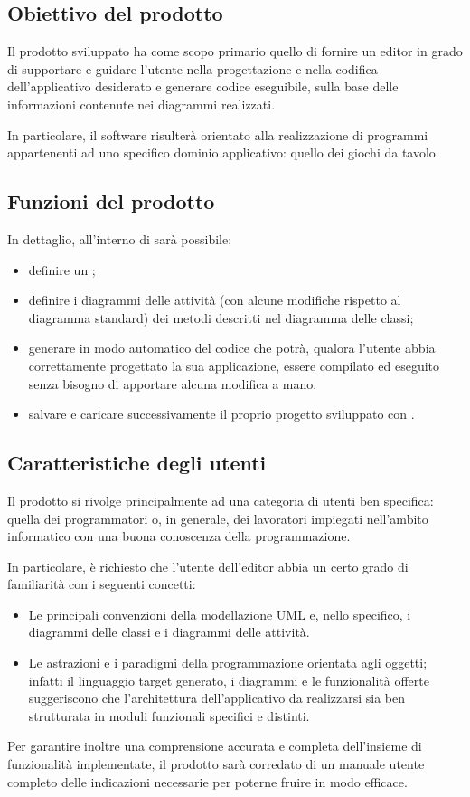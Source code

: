 \subsection{Obiettivo del prodotto}
Il prodotto sviluppato ha come scopo primario quello di fornire un editor in grado di supportare e guidare l'utente nella progettazione e nella codifica dell'applicativo desiderato e generare codice eseguibile, sulla base delle informazioni contenute nei diagrammi realizzati.

In particolare, il software risulterà orientato alla realizzazione di programmi appartenenti ad uno specifico dominio applicativo: quello dei giochi da tavolo.

\subsection{Funzioni del prodotto}
In dettaglio, all'interno di \proj{} sarà possibile:
\begin{itemize}
	\item definire un ;
	\item definire i diagrammi delle attività (con alcune modifiche rispetto al diagramma standard) dei metodi descritti nel diagramma delle classi;
	\item generare in modo automatico del codice che potrà, qualora l'utente abbia correttamente progettato la sua applicazione, essere compilato ed eseguito senza bisogno di apportare alcuna modifica a mano.
	\item salvare e caricare successivamente il proprio progetto sviluppato con \proj.
\end{itemize}

\subsection{Caratteristiche degli utenti}
Il prodotto \proj{} si rivolge principalmente ad una categoria di utenti ben specifica: quella dei programmatori o, in generale, dei lavoratori impiegati nell'ambito informatico con una buona conoscenza della programmazione.

In particolare, è richiesto che l'utente dell'editor abbia un certo grado di familiarità con i seguenti concetti:
\begin{itemize}
	\item Le principali convenzioni della modellazione UML e, nello specifico, i diagrammi delle classi e i diagrammi delle attività.
	\item Le astrazioni e i paradigmi della programmazione orientata agli oggetti; infatti il linguaggio target generato, i diagrammi e le funzionalità offerte suggeriscono che l'architettura dell'applicativo da realizzarsi sia ben strutturata in moduli funzionali specifici e distinti.
\end{itemize}
Per garantire inoltre una comprensione accurata e completa dell'insieme di funzionalità implementate, il prodotto sarà corredato di un manuale utente completo delle indicazioni necessarie per poterne fruire in modo efficace.

